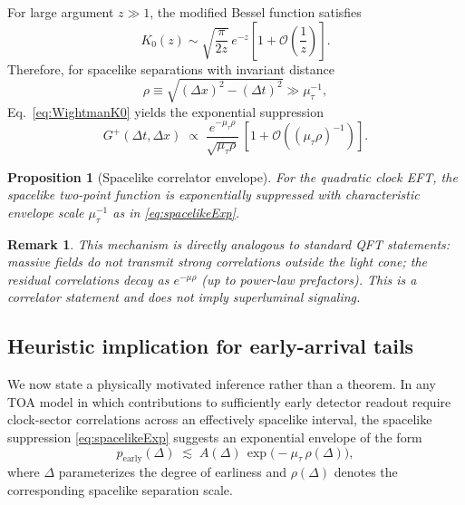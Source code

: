 \documentclass[pdflatex,sn-mathphys-num]{sn-jnl}
\theoremstyle{thmstylethree}
\theoremstyle{thmstyleone}
\newtheorem{proposition}{Proposition}[section]
\theoremstyle{thmstyletwo}
\newtheorem{remark}{Remark}[section]
\numberwithin{equation}{section}
\newcommand{\cO}{\mathcal{O}}
\newcommand{\Gplus}{G^{+}}
\newcommand{\Kzero}{K_{0}}
\begin{document}
        For large argument $z\gg 1$, the modified Bessel function satisfies
        \begin{equation}
            \Kzero(z)\sim \sqrt{\frac{\pi}{2z}}\,e^{-z}\left[1+\cO\!\left(\frac{1}{z}\right)\right].
            \label{eq:K0asym}
        \end{equation}
        Therefore, for spacelike separations with invariant distance
        \begin{equation}
            \rho \equiv \sqrt{(\Delta x)^2-(\Delta t)^2}\gg \mu_\tau^{-1},
        \end{equation}
        Eq.~\eqref{eq:WightmanK0} yields the exponential suppression
        \begin{equation}
            \Gplus(\Delta t,\Delta x)\;\propto\;
            \frac{e^{-\mu_\tau \rho}}{\sqrt{\mu_\tau \rho}}\,
            \left[1+\cO\!\left((\mu_\tau\rho)^{-1}\right)\right].
            \label{eq:spacelikeExp}
        \end{equation}
        
        \begin{proposition}[Spacelike correlator envelope]
For the quadratic clock EFT, the spacelike two-point function is exponentially suppressed with characteristic envelope scale $\mu_\tau^{-1}$ as in \eqref{eq:spacelikeExp}.
        \end{proposition}
        
        \begin{remark}
            This mechanism is directly analogous to standard QFT statements: massive fields do not transmit strong correlations outside the light cone; the residual correlations decay as $e^{-\mu \rho}$ (up to power-law prefactors). This is a correlator statement and does not imply superluminal signaling.
        \end{remark}
    
    \subsection{Heuristic implication for early-arrival tails}
        
        We now state a physically motivated inference rather than a theorem. In any TOA model in which contributions to sufficiently early detector readout require clock-sector correlations across an effectively spacelike interval, the spacelike suppression \eqref{eq:spacelikeExp} suggests an exponential envelope of the form
        \begin{equation}
            p_{\mathrm{early}}(\Delta)\;\lesssim\;A(\Delta)\,\exp\!\big(-\mu_\tau\,\rho(\Delta)\big),
            \label{eq:earlyBound}
        \end{equation}
        where $\Delta$ parameterizes the degree of earliness and $\rho(\Delta)$ denotes the corresponding spacelike separation scale.
        
\end{document}
